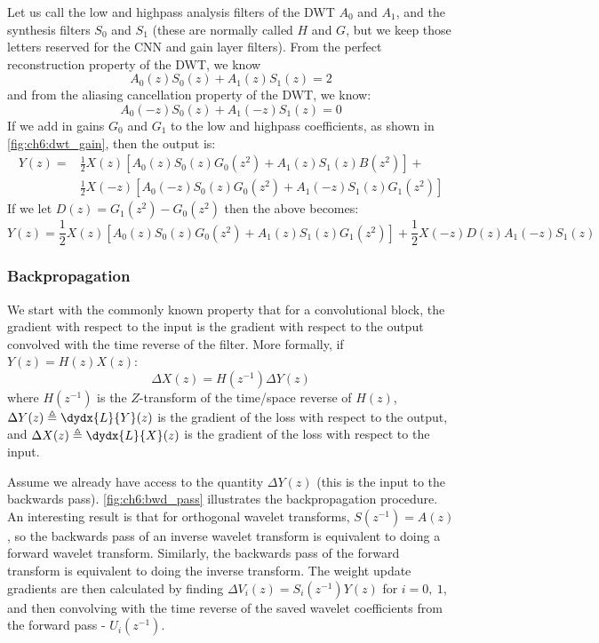 Let us call the low and highpass analysis filters of the DWT $A_0$ and $A_1$,
and the synthesis filters $S_0$ and $S_1$ (these are normally called $H$ and
$G$, but we keep those letters reserved for the CNN and gain layer filters). 
From the perfect reconstruction property of the DWT, we know 
\begin{equation}
  A_0(z)S_0(z) + A_1(z)S_1(z) = 2
\end{equation}
and from the aliasing cancellation property of the DWT, we know:
\begin{equation}
  A_0(-z)S_0(z) + A_1(-z)S_1(z) = 0
\end{equation}
%
If we add in gains $G_0$ and $G_1$ to the low and highpass coefficients, as
shown in \autoref{fig:ch6:dwt_gain}, then the output is:
\begin{equation}
  \begin{split}
   Y(z) =& \frac{1}{2} X(z) \left[A_0(z)S_0(z)G_0(z^2) + A_1(z)S_1(z)B(z^2) \right] + \\
         & \frac{1}{2}X(-z) \left[A_0(-z)S_0(z)G_0(z^2) + A_1(-z)S_1(z)G_1(z^2) \right]
\end{split}
\end{equation}
If we let $D(z) = G_1(z^2) - G_0(z^2)$ then the above becomes:
\begin{equation}
  Y(z) = \frac{1}{2} X(z) \left[A_0(z)S_0(z)G_0(z^2) + A_1(z)S_1(z)G_1(z^2) \right] + 
         \frac{1}{2}X(-z)D(z)A_1(-z)S_1(z) \label{eq:ch6:dwt_fwd}
\end{equation}

\subsubsection{Backpropagation}\label{sec:ch6:dwt_update}
We start with the commonly known property that for a convolutional block, the
gradient with respect to the input is the gradient with respect to the output
convolved with the time reverse of the filter. More formally, if 
$Y(z) = H(z) X(z)$:
%
\begin{equation}\label{eq:ch6:backprop}
  \Delta X(z) = H(z^{-1}) \Delta Y(z)
\end{equation}
%
where $H(z^{-1})$ is the $Z$-transform of the time/space reverse of $H(z)$,
$\Delta Y(z) \triangleq \dydx{L}{Y}(z)$ is the gradient of the loss with respect
to the output, and $\Delta X(z) \triangleq \dydx{L}{X}(z)$ is the gradient of
the loss with respect to the input. 

Assume we already have access to the quantity $\Delta Y(z)$ (this is the input
to the backwards pass). \autoref{fig:ch6:bwd_pass} illustrates the
backpropagation procedure. An interesting result is that for orthogonal wavelet
transforms, $S(z^{-1}) = A(z)$, so the backwards pass of an inverse wavelet
transform is equivalent to doing a forward wavelet transform. Similarly, the
backwards pass of the forward transform is equivalent to doing the inverse
transform. The weight update gradients are then calculated by finding 
$\Delta V_i(z) = S_i(z^{-1})Y(z)$ for $i=0,\ 1$, and then convolving with the
time reverse of the saved wavelet coefficients from the forward pass -
$U_i(z^{-1})$.

